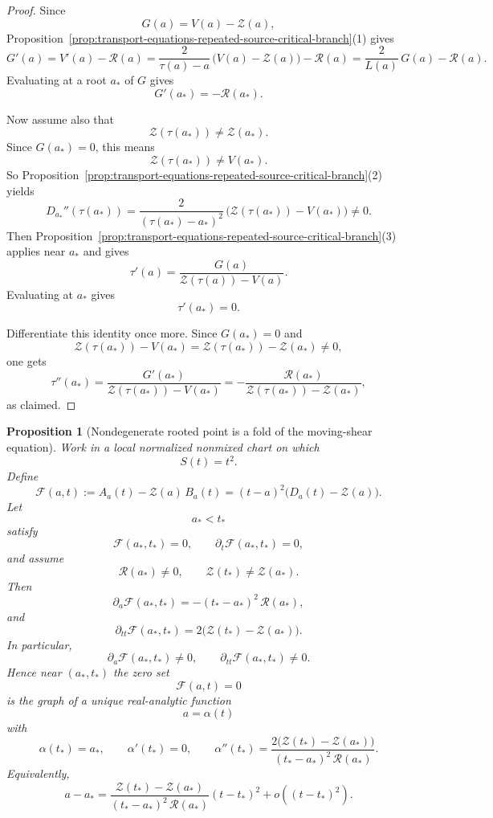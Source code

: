 \documentclass[11pt,a4paper]{amsart}
\theoremstyle{plain}
\newtheorem{proposition}[theorem]{Proposition}
\theoremstyle{definition}
\begin{document}
\begin{proof}
Since
\[
G(a)=V(a)-\mathcal Z(a),
\]
Proposition~\ref{prop:transport-equations-repeated-source-critical-branch}(1)
gives
\[
G'(a)=V'(a)-\mathcal R(a)
=\frac{2}{\tau(a)-a}\,\bigl(V(a)-\mathcal Z(a)\bigr)-\mathcal R(a)
=\frac{2}{L(a)}\,G(a)-\mathcal R(a).
\]
Evaluating at a root $a_*$ of $G$ gives
\[
G'(a_*)=-\mathcal R(a_*).
\]

Now assume also that
\[
\mathcal Z(\tau(a_*))\neq \mathcal Z(a_*).
\]
Since $G(a_*)=0$, this means
\[
\mathcal Z(\tau(a_*))\neq V(a_*).
\]
So Proposition~\ref{prop:transport-equations-repeated-source-critical-branch}(2)
yields
\[
D_{a_*}''(\tau(a_*))
=
\frac{2}{(\tau(a_*)-a_*)^2}\,
\bigl(\mathcal Z(\tau(a_*))-V(a_*)\bigr)
\neq 0.
\]
Then Proposition~\ref{prop:transport-equations-repeated-source-critical-branch}(3)
applies near $a_*$ and gives
\[
\tau'(a)
=
\frac{G(a)}{\mathcal Z(\tau(a))-V(a)}.
\]
Evaluating at $a_*$ gives
\[
\tau'(a_*)=0.
\]

Differentiate this identity once more. Since $G(a_*)=0$ and
\[
\mathcal Z(\tau(a_*))-V(a_*)=\mathcal Z(\tau(a_*))-\mathcal Z(a_*)\neq 0,
\]
one gets
\[
\tau''(a_*)
=
\frac{G'(a_*)}{\mathcal Z(\tau(a_*))-V(a_*)}
=
-\frac{\mathcal R(a_*)}{\mathcal Z(\tau(a_*))-\mathcal Z(a_*)},
\]
as claimed.
\end{proof}

\begin{proposition}[Nondegenerate rooted point is a fold of the moving-shear equation]
\label{prop:nondegenerate-rooted-point-is-moving-shear-fold}
Work in a local normalized nonmixed chart on which
\[
S(t)=t^2.
\]
Define
\[
\mathscr F(a,t):=A_a(t)-\mathcal Z(a)\,B_a(t)
=(t-a)^2\bigl(D_a(t)-\mathcal Z(a)\bigr).
\]
Let
\[
a_*<t_*
\]
satisfy
\[
\mathscr F(a_*,t_*)=0,
\qquad
\partial_t\mathscr F(a_*,t_*)=0,
\]
and assume
\[
\mathcal R(a_*)\neq 0,
\qquad
\mathcal Z(t_*)\neq \mathcal Z(a_*).
\]
Then
\[
\partial_a\mathscr F(a_*,t_*)
=
-(t_*-a_*)^2\,\mathcal R(a_*),
\]
and
\[
\partial_{tt}\mathscr F(a_*,t_*)
=
2\bigl(\mathcal Z(t_*)-\mathcal Z(a_*)\bigr).
\]
In particular,
\[
\partial_a\mathscr F(a_*,t_*)\neq 0,
\qquad
\partial_{tt}\mathscr F(a_*,t_*)\neq 0.
\]
Hence near $(a_*,t_*)$ the zero set
\[
\mathscr F(a,t)=0
\]
is the graph of a unique real-analytic function
\[
a=\alpha(t)
\]
with
\[
\alpha(t_*)=a_*,
\qquad
\alpha'(t_*)=0,
\qquad
\alpha''(t_*)
=
\frac{2\bigl(\mathcal Z(t_*)-\mathcal Z(a_*)\bigr)}
{(t_*-a_*)^2\,\mathcal R(a_*)}.
\]
Equivalently,
\[
a-a_*
=
\frac{\mathcal Z(t_*)-\mathcal Z(a_*)}
{(t_*-a_*)^2\,\mathcal R(a_*)}(t-t_*)^2
+o\!\left((t-t_*)^2\right).
\]
\end{proposition}
\end{document}
